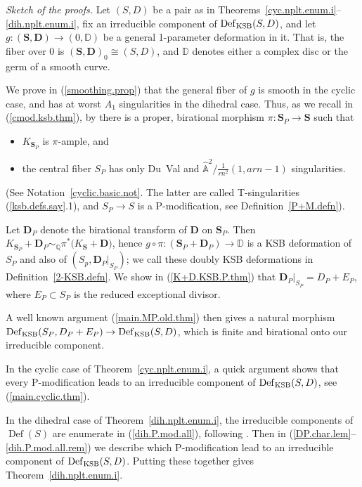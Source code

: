 \documentclass{amsart}
\theoremstyle{definition}
\theoremstyle{remark}
\renewcommand{\a}[0]{\hat{\mathbb A}}
\newcommand{\dd}[0]{{\mathbb D}}
\newcommand{\q}[0]{{\mathbb Q}}
\newcommand{\simq}[0]{\sim_{\q}}
\newcommand{\defsp}[0]{\operatorname{Def}}
\begin{document}
\medskip




{\it Sketch of the proofs.}
Let $(S, D)$ be a pair as in
Theorems~\ref{cyc.nplt.enum.i}--\ref{dih.nplt.enum.i}, fix  an irreducible component of
  $\defsp_{\rm KSB}(S, D)$,  and let
$g:({\mathbf S}, {\mathbf D})\to  (0,\dd)$
be a general 1-parameter deformation in it. That is,  the fiber over $0$ is
 $({\mathbf S}, {\mathbf D})_0\cong (S, D)$, and $\dd$ denotes either a complex disc or the germ of a smooth curve.

 We prove in (\ref{smoothing.prop}) that the general fiber of $g$ is smooth in the cyclic case, and has at worst $A_1$ singularities in the dihedral case.  Thus, as we recall in (\ref{cmod.ksb.thm}), by \cite[3.5]{ksb} there is a 
proper, birational morphism $\pi:{\mathbf S}_P\to {\mathbf S}$ such that
 \begin{itemize}
 \item $K_{{\mathbf S}_P}$ is $\pi$-ample, and
   \item the central fiber 
 $S_P$ has only  Du~Val and $\a^2/\tfrac1{rn^2}(1, arn{-}1)$  singularities.
 \end{itemize}
 (See Notation~\ref{cyclic.basic.not}.
 The latter are called T-singularities  (\ref{ksb.defs.say}.1), and
 $S_P\to S$ is a 
   P-modification, see   Definition~\ref{P+M.defn}).
 
 Let ${\mathbf D}_P$ denote the birational transform of ${\mathbf D}$ on
 ${\mathbf S}_P$.  Then
 $K_{{\mathbf S}_P}+{\mathbf D}_P\simq \pi^*\bigl(K_{{\mathbf S}}+{\mathbf D}\bigr)$, hence 
 $g\circ\pi:({\mathbf S}_P+{\mathbf D}_P)\to \dd$
 is a KSB deformation of $S_P$ and also of   $(S_p, {\mathbf D}_P|_{S_P})$;
 we call these doubly KSB deformations  in Definition~\ref{2-KSB.defn}.
 We show in (\ref{K+D.KSB.P.thm}) that ${\mathbf D}_P|_{S_P}=D_P+E_P$, where
 $E_P\subset S_P$ is the reduced exceptional divisor.

 A well known argument (\ref{main.MP.old.thm}) then  gives  a natural morphism
$\defsp_{\rm KSB}(S_P, D_P+E_P) \to \defsp_{\rm KSB}(S,D)$, which is 
      finite and  birational  onto our irreducible component.
   
In the cyclic case of Theorem~\ref{cyc.nplt.enum.i}, a quick argument shows that every P-modification leads to an  irreducible component of 
$\defsp_{\rm KSB}(S,D)$, see (\ref{main.cyclic.thm}).

In the dihedral  case of Theorem~\ref{dih.nplt.enum.i},  the irreducible components of $\defsp(S)$ are enumerate in (\ref{dih.P.mod.all}), following \cite{MR1129040, MR1213355}.
Then in (\ref{DP.char.lem}--\ref{dih.P.mod.all.rem})  we describe which P-modification lead to an  irreducible component of 
$\defsp_{\rm KSB}(S,D)$.    Putting these together gives 
Theorem~\ref{dih.nplt.enum.i}.
\end{document}
